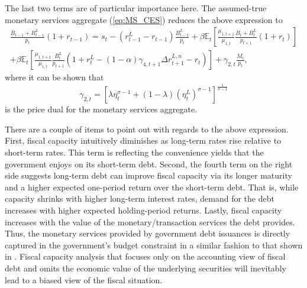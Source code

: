 \documentclass[11pt,a4paper,margin=1.5in]{article}
\begin{document}
The last two terms are of particular importance here.
The assumed-true monetary services aggregate (\ref{eq:MS_CES}) reduces the above expression to 
\begin{multline}
	\frac{B_{t-1} + B^L_{t-1}}{p_t}(1+r_{t-1})= s_t  - (r_{t-1}^L - r_{t-1})\frac{B^L_{t-1}}{p_t} + \beta\mathbb{E}_t\left[\frac{\mu_{1,t+1}}{\mu_{1,t}} \frac{B_{t} +B^L_{t}}{p_{t+1}}(1+r_{t})\right] \\ 
		+ \beta\mathbb{E}_t\left[\frac{\mu_{1,t+1}}{\mu_{1,t}} \frac{B^L_{t}}{p_{t+1}}(1+r^L_{t} - (1-\alpha)\gamma_{4,t+1}\Delta r^{L,n}_{t+1} - r_t)\right] 
		+  \gamma_{2,t}\frac{M_t}{p_t},
	\label{eq:fiscalcapacity}
\end{multline}
where it can be shown that
\begin{equation}
	\gamma_{2,t} = \left[\lambda \eta_t^{\sigma-1} + (1-\lambda)\left(\eta^L_t\right)^{\sigma-1}\right]^\frac{1}{\sigma-1}
	\label{eq:price_dual}
\end{equation}
is the price dual for the monetary services aggregate. 

There are a couple of items to point out with regards to the above expression.
First, fiscal capacity intuitively diminishes as long-term rates rise relative to short-term rates.
This term is reflecting the convenience yields that the government enjoys on its short-term debt.
Second, the fourth term on the right side suggests long-term debt can improve fiscal capacity via its longer maturity and a higher expected one-period return over the short-term debt. 
That is, while capacity shrinks with higher long-term interest rates, demand for the debt increases with higher expected holding-period returns. 
Lastly, fiscal capacity increases with the value of the monetary/transaction services the debt provides.
Thus, the monetary services provided by government debt issuances is directly captured in the government's budget constraint in a similar fashion to that shown in \citet{Brunnermeier-Merkel-Sannikov:2022}.
Fiscal capacity analysis that focuses only on the accounting view of fiscal debt and omits the economic value of the underlying securities will inevitably lead to a biased view of the fiscal situation.
\end{document}
